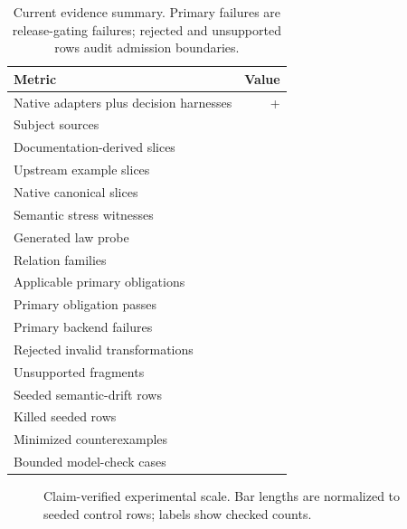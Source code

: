 \documentclass[10pt,conference]{IEEEtran}
\begin{document}
\begin{table}[t]
\centering
\caption{Current evidence summary.  Primary failures are release-gating failures; rejected and unsupported rows audit admission boundaries.}
\label{tab:results}
\begin{tabular}{lr}
\toprule
Metric & Value \\
\midrule
Native adapters plus decision harnesses & \LGNativeAdapters{}+\LGDecisionHarnesses{} \\
Subject sources & \LGSources{} \\
Documentation-derived slices & \LGOfficialDocSources{} \\
Upstream example slices & \LGUpstreamExampleSources{} \\
Native canonical slices & \LGNativeCanonicalSources{} \\
Semantic stress witnesses & \LGStressWitnessSources{} \\
Generated law probe & \LGGeneratedSources{} \\
Relation families & \LGRelations{} \\
Applicable primary obligations & \LGPrimaryObligations{} \\
Primary obligation passes & \LGPrimaryPasses{} \\
Primary backend failures & \LGPrimaryFailures{} \\
Rejected invalid transformations & \LGRejected{} \\
Unsupported fragments & \LGUnsupported{} \\
Seeded semantic-drift rows & \LGSeededRows{} \\
Killed seeded rows & \LGSeededKilled{} \\
Minimized counterexamples & \LGCounterexamples{} \\
Bounded model-check cases & \LGModelCheckCases{} \\
\bottomrule
\end{tabular}
\end{table}

\begin{figure}[t]
\centering
{}
\caption{Claim-verified experimental scale.  Bar lengths are normalized to seeded control rows; labels show checked counts.}
\label{fig:evidencebars}
\end{figure}
\end{document}
